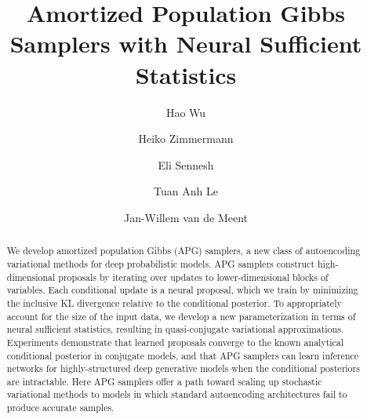 \documentclass[anonymous=false, %
               format=acmsmall, %
               review=true, %
               screen=true, %
               nonacm=true]{acmart}
\theoremstyle{definition}
\begin{document}
\title{Amortized Population Gibbs Samplers with Neural Sufficient Statistics}

\author{Hao Wu}

\author{Heiko Zimmermann}

\author{Eli Sennesh}

\author{Tuan Anh Le}

\author{Jan-Willem van de Meent}

\begin{abstract}
We develop amortized population Gibbs (APG) samplers, a new class of autoencoding variational methods for deep probabilistic models. APG samplers construct high-dimensional proposals by iterating over updates to lower-dimensional blocks of variables. Each conditional update is a neural proposal, which we train by minimizing the inclusive KL divergence relative to the conditional posterior. To appropriately account for the size of the input data, we develop a new parameterization in terms of neural sufficient statistics, resulting in quasi-conjugate variational approximations. Experiments demonstrate that learned proposals converge to the known analytical conditional posterior in conjugate models, and that APG samplers can learn inference networks for highly-structured deep generative models when the conditional posteriors are intractable. Here APG samplers offer a path toward scaling up stochastic variational methods to models in which standard autoencoding architectures fail to produce accurate samples.
\end{abstract}
\end{document}
